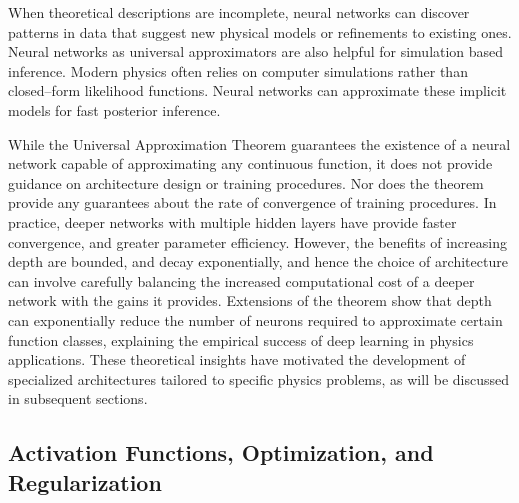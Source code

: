             When theoretical descriptions are incomplete, neural networks can discover patterns in data that suggest new physical models or refinements to existing ones.
            Neural networks as universal approximators are also helpful for simulation based inference.
            Modern physics often relies on computer simulations rather than closed--form likelihood functions.
            Neural networks can approximate these implicit models for fast posterior inference.

            While the Universal Approximation Theorem guarantees the existence of a neural network capable of approximating any continuous function, it does not provide guidance on architecture design or training procedures.
            Nor does the theorem provide any guarantees about the rate of convergence of training procedures.
            In practice, deeper networks with multiple hidden layers have provide faster convergence, and greater parameter efficiency.
            However, the benefits of increasing depth are bounded, and decay exponentially, and hence the choice of architecture can involve carefully balancing the increased computational cost of a deeper network with the gains it provides.
            Extensions of the theorem show that depth can exponentially reduce the number of neurons required to approximate certain function classes, explaining the empirical success of deep learning in physics applications.
            These theoretical insights have motivated the development of specialized architectures tailored to specific physics problems, as will be discussed in subsequent sections.
    \subsection{Activation Functions, Optimization, and Regularization}
